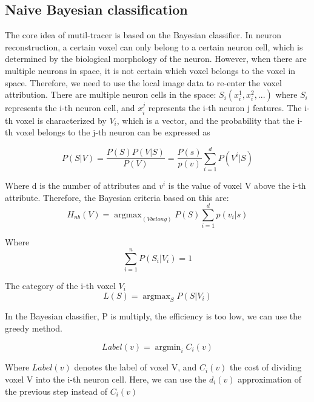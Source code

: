\documentclass[runningheads]{llncs}
\begin{document}
\subsection{Naive Bayesian classification}

The core idea of mutil-tracer is based on the Bayesian classifier. In neuron reconstruction, a certain voxel can only belong to a certain neuron cell, which is determined by the biological morphology of the neuron. However, when there are multiple neurons in space, it is not certain which voxel belongs to the voxel in space. Therefore, we need to use the local image data to re-enter the voxel attribution.
There are multiple neuron cells in the space: $S_i(x_i^1, x_i^2,...)$ where $S_i$ represents the i-th neuron cell, and $x_i^j$ represents the i-th neuron j features. The i-th voxel is characterized by $V_i$, which is a vector, and the probability that the i-th voxel belongs to the j-th neuron can be expressed as

\begin{equation}
P(S|V)=\frac{P(S)P(V|S)}{P(V)}=\frac{P(s)}{p(v)}\sum_{i=1}^ {d}P(V^i|S)
\end{equation}



Where d is the number of attributes and $v^i$ is the value of voxel V above the i-th attribute. Therefore, the Bayesian criteria based on this are:
\begin{equation}
H_{nb}{(V)}=\mathop{\arg\max}_{(V belong )}P(S)\sum_{i=1}^d p(v_i|s)
\end{equation}

Where 
\begin{equation}
\sum_{i=1}^n P(S_i|V_i)=1
\end{equation}

The category of the i-th voxel $V_i$
\begin{equation}
L(S)=\mathop{\arg\max}_{S}P(S|V_i)
\end{equation}

In the Bayesian classifier, P is multiply, the efficiency is too low, we can use the greedy method.

\begin{equation}
Label(v)=\mathop{\arg\min}_{i}C_i(v)
\end{equation}

Where $Label(v)$ denotes the label of voxel V, and $C_i(v)$ the cost of dividing voxel V into the i-th neuron cell.
Here, we can use the $d_i(v)$ approximation of the previous step instead of $C_i(v)$
\end{document}
